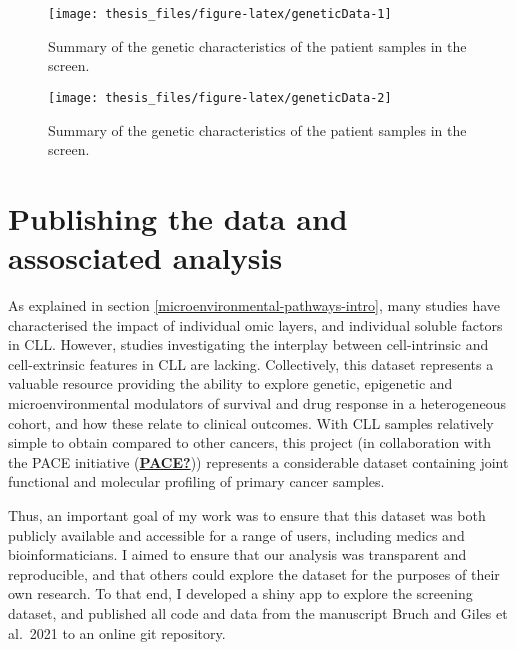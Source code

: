 \documentclass[11pt, a4paper, twosided]{book}
\begin{document}
\begin{figure}

{\centering \texttt{[image: thesis\_files/figure-latex/geneticData-1]} 

}

\caption{Summary of the genetic characteristics of the patient samples in the screen.}\label{fig:geneticData-1}
\end{figure}
\begin{figure}

{\centering \texttt{[image: thesis\_files/figure-latex/geneticData-2]} 

}

\caption{Summary of the genetic characteristics of the patient samples in the screen.}\label{fig:geneticData-2}
\end{figure}
\hypertarget{publishing-the-data-and-assosciated-analysis}{%
\section{Publishing the data and assosciated analysis}\label{publishing-the-data-and-assosciated-analysis}}

As explained in section \ref{microenvironmental-pathways-intro}, many studies have characterised the impact of individual omic layers, and individual soluble factors in CLL. However, studies investigating the interplay between cell-intrinsic and cell-extrinsic features in CLL are lacking. Collectively, this dataset represents a valuable resource providing the ability to explore genetic, epigenetic and microenvironmental modulators of survival and drug response in a heterogeneous cohort, and how these relate to clinical outcomes. With CLL samples relatively simple to obtain compared to other cancers, this project (in collaboration with the PACE initiative (\protect\hyperlink{ref-PACE}{\textbf{PACE?}})) represents a considerable dataset containing joint functional and molecular profiling of primary cancer samples.

Thus, an important goal of my work was to ensure that this dataset was both publicly available and accessible for a range of users, including medics and bioinformaticians. I aimed to ensure that our analysis was transparent and reproducible, and that others could explore the dataset for the purposes of their own research. To that end, I developed a shiny app to explore the screening dataset, and published all code and data from the manuscript Bruch and Giles et al.~2021 to an online git repository.
\end{document}
